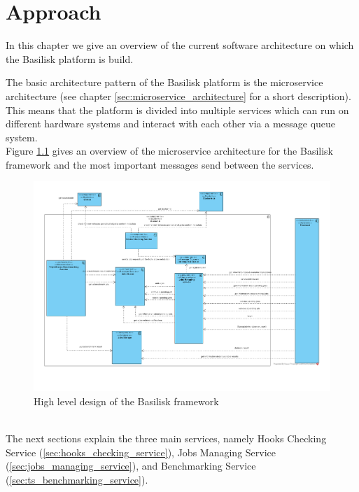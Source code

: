 \chapter{Approach}
\label{ch:approach}

In this chapter we give an overview of the current software architecture on which the Basilisk platform is build.

The basic architecture pattern of the Basilisk platform is the microservice architecture (see chapter \ref{sec:microservice_architecture} for a short description). 
This means that the platform is divided into multiple services which can run on different hardware systems and interact with each other via a message queue system.
\\


Figure \ref{fig:basilisk_high_level_design} gives an overview of the microservice architecture for the Basilisk framework and the most important messages send between the services.
\begin{figure}[tbph]
	\centering
	\includegraphics[width=1.1\textwidth]{figures/basilisk_high_level_design.pdf}
	\caption{High level design of the Basilisk framework}
	\label{fig:basilisk_high_level_design}
\end{figure}
\\

The next sections explain the three main services, namely Hooks Checking Service (\ref{sec:hooks_checking_service}), Jobs Managing Service (\ref{sec:jobs_managing_service}), and \ts{} Benchmarking Service (\ref{sec:ts_benchmarking_service}).

